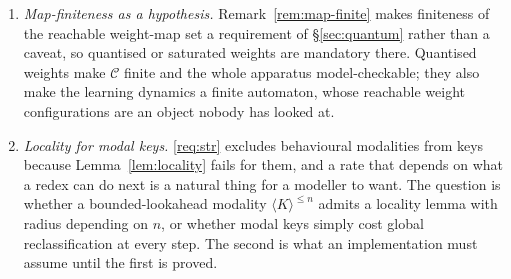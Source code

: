 \documentclass[11pt,a4paper]{article}
\theoremstyle{plain}
\theoremstyle{definition}
\theoremstyle{remark}
\newcommand{\Rnn}{\mathbb{R}_{\geq 0}}
\newcommand{\Cfg}{\mathcal{C}}
\begin{document}
\begin{enumerate}[leftmargin=2.2em]
develops the flat-substitution instance independently. Whether it is an instance of
Definition~\ref{def:wmap} or a genuinely different decoration --- the fuzzy comm rule transmits a
modified payload, which no weighting here does --- is not settled. Remark~\ref{rem:codomain} sharpens
the test: a codomain is a genuine instance of the parameter only if it comes with an interpretation
map into $\Rnn$ under which the propensity of Definition~\ref{def:propensity} is unchanged, and the
interesting question about the quantale case is whether it has one.
\item \emph{Map-finiteness as a hypothesis.} Remark~\ref{rem:map-finite} makes finiteness of the
reachable weight-map set a requirement of \S\ref{sec:quantum} rather than a caveat, so quantised or
saturated weights are mandatory there. Quantised weights make $\Cfg$ finite and the whole apparatus
model-checkable; they also make the learning dynamics a finite automaton, whose reachable weight
configurations are an object nobody has looked at.
\item \emph{Locality for modal keys.} \ref{req:str} excludes behavioural modalities from keys because
Lemma~\ref{lem:locality} fails for them, and a rate that depends on what a redex can do next is a
natural thing for a modeller to want. The question is whether a bounded-lookahead modality
$\langle K\rangle^{\le n}$ admits a locality lemma with radius depending on $n$, or whether modal keys
simply cost global reclassification at every step. The second is what an implementation must assume
until the first is proved.
\end{enumerate}
\end{document}
